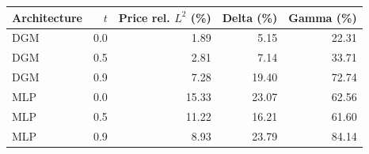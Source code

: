 \begin{tabular}{lrrrr}
\toprule
Architecture & $t$ & Price rel. $L^2$ (\%) & Delta (\%) & Gamma (\%) \\
\midrule
DGM & 0.0 & 1.89 & 5.15 & 22.31 \\
DGM & 0.5 & 2.81 & 7.14 & 33.71 \\
DGM & 0.9 & 7.28 & 19.40 & 72.74 \\
MLP & 0.0 & 15.33 & 23.07 & 62.56 \\
MLP & 0.5 & 11.22 & 16.21 & 61.60 \\
MLP & 0.9 & 8.93 & 23.79 & 84.14 \\
\bottomrule
\end{tabular}

